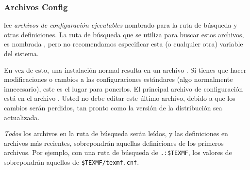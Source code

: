 \documentclass{article}
\begin{document}
\subsubsection{Archivos Config}

\KPS{} lee \emph{archivos de configuración ejecutables} nombrado
 para la ruta de búsqueda y otras
definiciones. La ruta de búsqueda que se utiliza para buscar
estos archivos, es nombrada , pero no
recomendamos especificar esta (o cualquier otra) variable del
sistema. 

En vez de esto, una instalación normal resulta en un archivo
. Si tienes que hacer
modificaciones o cambios a las configuraciones estándares (algo
normalmente innecesario), este es el lugar para ponerlos. El
principal archivo de configuración está en el archivo
.  Usted no debe
editar este último archivo, debido a que los cambios serán
perdidos, tan pronto como la versión de la distribución sea
actualizada. 

\emph{Todos} los archivos  en la ruta de
búsqueda serán leídos, y las definiciones en archivos más
recientes, sobrepondrán aquellas definiciones de los primeros archivos. Por
ejemplo, con una ruta de búsqueda de \verb|.:$TEXMF|, los
valores de  sobrepondrán aquellos de
\verb|$TEXMF/texmf.cnf|.
\end{document}
